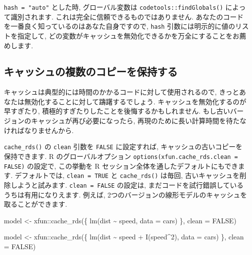 \documentclass[
  11pt,
  lualatex,ja=standard,jafont=noto]{bxjsreport}
\newenvironment{Shaded}{\begin{snugshade}}{\end{snugshade}}
\newcommand{\AttributeTok}[1]{\textcolor[rgb]{0.77,0.63,0.00}{#1}}
\newcommand{\ConstantTok}[1]{\textcolor[rgb]{0.00,0.00,0.00}{#1}}
\newcommand{\DecValTok}[1]{\textcolor[rgb]{0.00,0.00,0.81}{#1}}
\newcommand{\FunctionTok}[1]{\textcolor[rgb]{0.00,0.00,0.00}{#1}}
\newcommand{\NormalTok}[1]{#1}
\newcommand{\OtherTok}[1]{\textcolor[rgb]{0.56,0.35,0.01}{#1}}
\newcommand{\SpecialCharTok}[1]{\textcolor[rgb]{0.00,0.00,0.00}{#1}}
\begin{document}
\texttt{hash = "auto"} とした時, グローバル変数は \texttt{codetools::findGlobals()} によって識別されます. これは完全に信頼できるものではありません. あなたのコードを一番良く知っているのはあなた自身ですので, \texttt{hash} 引数には明示的に値のリストを指定して, どの変数がキャッシュを無効化できるかを万全にすることをお薦めします.

\hypertarget{ux30adux30e3ux30c3ux30b7ux30e5ux306eux8907ux6570ux306eux30b3ux30d4ux30fcux3092ux4fddux6301ux3059ux308b}{%
\subsection{キャッシュの複数のコピーを保持する}\label{ux30adux30e3ux30c3ux30b7ux30e5ux306eux8907ux6570ux306eux30b3ux30d4ux30fcux3092ux4fddux6301ux3059ux308b}}

キャッシュは典型的には時間のかかるコードに対して使用されるので, きっとあなたは無効化することに対して躊躇するでしょう. キャッシュを無効化するのが早すぎたり, 積極的すぎたりしたことを後悔するかもしれません. もし古いバージョンのキャッシュが再び必要になったら, 再現のために長い計算時間を待たなければなりませんから.

\texttt{cache\_rds()} の \texttt{clean} 引数を \texttt{FALSE} に設定すれば, キャッシュの古いコピーを保持できます. R のグローバルオプション \texttt{options(xfun.cache\_rds.clean = FALSE)} の設定で, この挙動を R セッション全体を通したデフォルトにもできます. デフォルトでは, \texttt{clean = TRUE} と \texttt{cache\_rds()} は毎回, 古いキャッシュを削除しようと試みます. \texttt{clean = FALSE} の設定は, まだコードを試行錯誤しているうちは有用になりえます. 例えば, 2つのバージョンの線形モデルのキャッシュを取ることができます.

\begin{Shaded}
\begin{Highlighting}[numbers=left,,]
\NormalTok{model }\OtherTok{\textless{}{-}}\NormalTok{ xfun}\SpecialCharTok{::}\FunctionTok{cache\_rds}\NormalTok{(\{}
  \FunctionTok{lm}\NormalTok{(dist }\SpecialCharTok{\textasciitilde{}}\NormalTok{ speed, }\AttributeTok{data =}\NormalTok{ cars)}
\NormalTok{\}, }\AttributeTok{clean =} \ConstantTok{FALSE}\NormalTok{)}

\NormalTok{model }\OtherTok{\textless{}{-}}\NormalTok{ xfun}\SpecialCharTok{::}\FunctionTok{cache\_rds}\NormalTok{(\{}
  \FunctionTok{lm}\NormalTok{(dist }\SpecialCharTok{\textasciitilde{}}\NormalTok{ speed }\SpecialCharTok{+} \FunctionTok{I}\NormalTok{(speed}\SpecialCharTok{\^{}}\DecValTok{2}\NormalTok{), }\AttributeTok{data =}\NormalTok{ cars)}
\NormalTok{\}, }\AttributeTok{clean =} \ConstantTok{FALSE}\NormalTok{)}
\end{Highlighting}
\end{Shaded}
\end{document}
